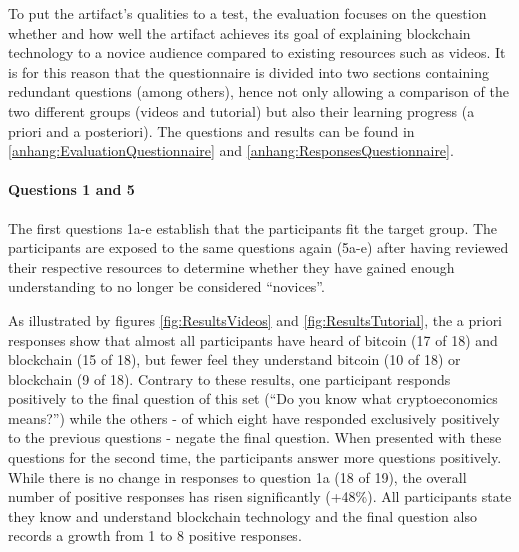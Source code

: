 To put the artifact's qualities to a test, the evaluation focuses on the question whether and how well the artifact achieves its goal of explaining blockchain technology to a novice audience compared to existing resources such as videos. It is for this reason that the questionnaire is divided into two sections containing redundant questions (among others), hence not only allowing a comparison of the two different groups (videos and tutorial) but also their learning progress (a priori and a posteriori). The questions and results can be found in \ref{anhang:EvaluationQuestionnaire} and \ref{anhang:ResponsesQuestionnaire}.

\paragraph{Questions 1 and 5}The first questions 1a-e establish that the participants fit the target group. The participants are exposed to the same questions again (5a-e) after having reviewed their respective resources to determine whether they have gained enough understanding to no longer be considered \enquote{novices}.

As illustrated by figures \ref{fig:ResultsVideos} and \ref{fig:ResultsTutorial}, the a priori responses show that almost all participants have heard of bitcoin (17 of 18) and blockchain (15 of 18), but fewer feel they understand bitcoin (10 of 18) or blockchain (9 of 18). Contrary to these results, one participant responds positively to the final question of this set (\enquote{Do you know what cryptoeconomics means?}) while the others - of which eight have responded exclusively positively to the previous questions - negate the final question. When presented with these questions for the second time, the participants answer more questions positively. While there is no change in responses to question 1a (18 of 19), the overall number of positive responses has risen significantly (+48\%). All participants state they know and understand blockchain technology and the final question also records a growth from 1 to 8 positive responses.

